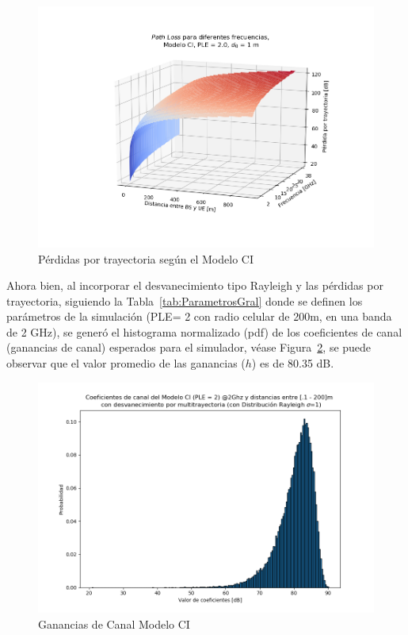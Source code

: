 \begin{figure}[th]
    \centering
    \includegraphics[scale=.6]{Figures/MODELOCI3D_1m.png}
    \decoRule
    \caption[Pérdidas por trayectoria según el Modelo CI]{Pérdidas por trayectoria según el Modelo CI}
    \label{fig:PerdidasCI_C6}
\end{figure}

Ahora bien, al incorporar el desvanecimiento tipo Rayleigh y las pérdidas por trayectoria, siguiendo la Tabla~\ref{tab:ParametrosGral} donde se definen los parámetros de la simulación (PLE= 2 con radio celular de 200m, en una banda de 2 GHz), se generó el histograma normalizado (pdf) de los coeficientes de canal (ganancias de canal) esperados para el simulador, véase Figura~\ref{fig:GananciasCI_C6}, se puede observar que el valor promedio de las ganancias ($h$) es de 80.35 dB. \newline

\begin{figure}[th]
    \centering
    \includegraphics[scale=.55]{Figures/CoeficientesCanalCI.png}
    \decoRule
    \caption[Ganancias de Canal Modelo CI]{Ganancias de Canal Modelo CI}
    \label{fig:GananciasCI_C6}
\end{figure}

